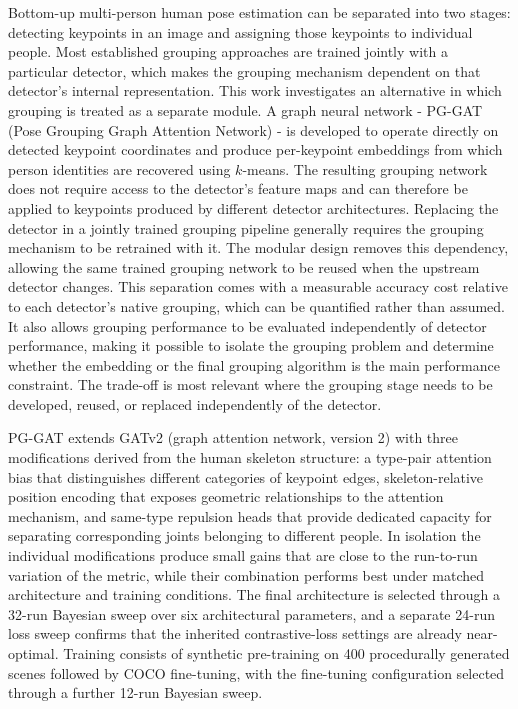 Bottom-up multi-person human pose estimation can be separated into two stages:
detecting keypoints in an image and assigning those keypoints to individual people.
Most established grouping approaches are trained jointly with a particular detector,
which makes the grouping mechanism dependent on that detector's internal representation.
This work investigates an alternative in which grouping is treated as a separate module.
A graph neural network - PG-GAT (Pose Grouping Graph Attention Network) -
is developed to operate directly on detected keypoint coordinates
and produce per-keypoint embeddings from which person identities are recovered using $k$-means.
The resulting grouping network does not require access to the detector's feature maps
and can therefore be applied to keypoints produced by different detector architectures.
Replacing the detector in a jointly trained grouping pipeline generally requires
the grouping mechanism to be retrained with it.
The modular design removes this dependency,
allowing the same trained grouping network to be reused when the upstream detector changes.
This separation comes with a measurable accuracy cost relative to each detector's native grouping,
which can be quantified rather than assumed.
It also allows grouping performance to be evaluated independently of detector performance,
making it possible to isolate the grouping problem
and determine whether the embedding or the final grouping algorithm is the main performance constraint.
The trade-off is most relevant where the grouping stage needs to be developed, reused, or replaced
independently of the detector.

PG-GAT extends GATv2 (graph attention network, version 2)
with three modifications derived from the human skeleton structure:
a type-pair attention bias that distinguishes different categories of keypoint edges,
skeleton-relative position encoding that exposes geometric relationships to the attention mechanism,
and same-type repulsion heads that provide dedicated capacity
for separating corresponding joints belonging to different people.
In isolation the individual modifications produce small gains that are close to the run-to-run variation of the metric,
while their combination performs best under matched architecture and training conditions.
The final architecture is selected through a 32-run Bayesian sweep over six architectural parameters,
and a separate 24-run loss sweep confirms that the inherited contrastive-loss settings are already near-optimal.
Training consists of synthetic pre-training on 400 procedurally generated scenes followed by COCO fine-tuning,
with the fine-tuning configuration selected through a further 12-run Bayesian sweep.


